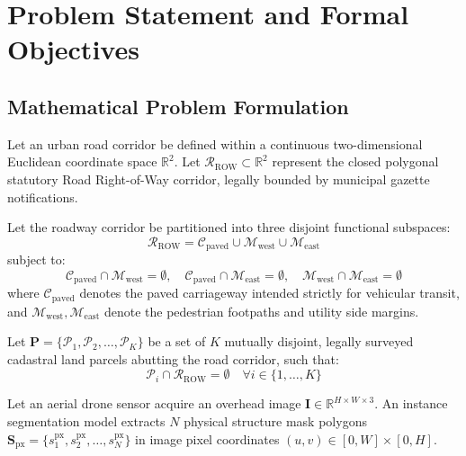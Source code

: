 \documentclass[conference]{IEEEtran}
\begin{document}
\section{Problem Statement and Formal Objectives}

\subsection{Mathematical Problem Formulation}
Let an urban road corridor be defined within a continuous two-dimensional Euclidean coordinate space $\mathbb{R}^2$. Let $\mathcal{R}_{\text{ROW}} \subset \mathbb{R}^2$ represent the closed polygonal statutory Road Right-of-Way corridor, legally bounded by municipal gazette notifications. 

Let the roadway corridor be partitioned into three disjoint functional subspaces:
\begin{equation}
\mathcal{R}_{\text{ROW}} = \mathcal{C}_{\text{paved}} \cup \mathcal{M}_{\text{west}} \cup \mathcal{M}_{\text{east}}
\end{equation}
subject to:
\begin{equation}
\mathcal{C}_{\text{paved}} \cap \mathcal{M}_{\text{west}} = \emptyset, \quad \mathcal{C}_{\text{paved}} \cap \mathcal{M}_{\text{east}} = \emptyset, \quad \mathcal{M}_{\text{west}} \cap \mathcal{M}_{\text{east}} = \emptyset
\end{equation}
where $\mathcal{C}_{\text{paved}}$ denotes the paved carriageway intended strictly for vehicular transit, and $\mathcal{M}_{\text{west}}, \mathcal{M}_{\text{east}}$ denote the pedestrian footpaths and utility side margins.

Let $\mathbf{P} = \{\mathcal{P}_1, \mathcal{P}_2, \dots, \mathcal{P}_K\}$ be a set of $K$ mutually disjoint, legally surveyed cadastral land parcels abutting the road corridor, such that:
\begin{equation}
\mathcal{P}_i \cap \mathcal{R}_{\text{ROW}} = \emptyset \quad \forall i \in \{1, \dots, K\}
\end{equation}

Let an aerial drone sensor acquire an overhead image $\mathbf{I} \in \mathbb{R}^{H \times W \times 3}$. An instance segmentation model extracts $N$ physical structure mask polygons $\mathbf{S}_{\text{px}} = \{s_1^{\text{px}}, s_2^{\text{px}}, \dots, s_N^{\text{px}}\}$ in image pixel coordinates $(u, v) \in [0, W] \times [0, H]$.
\end{document}
